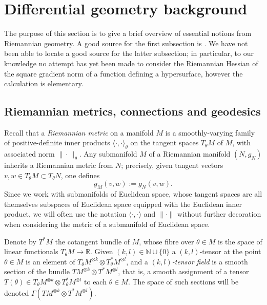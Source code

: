 \documentclass{article}
\newcommand{\RB}{\mathbb{R}}
\newcommand{\NB}{\mathbb{N}}
\theoremstyle{plain}
\theoremstyle{definition}
\theoremstyle{remark}
\begin{document}












\newpage

\appendix

\section{Differential geometry background}\label{app:diffgeom}

The purpose of this section is to give a brief overview of essential notions from Riemannian geometry. A good source for the first subsection is \cite{leeriem}. We have not been able to locate a good source for the latter subsection; in particular, to our knowledge no attempt has yet been made to consider the Riemannian Hessian of the square gradient norm of a function defining a hypersurface, however the calculation is elementary.

\subsection{Riemannian metrics, connections and geodesics}

Recall that a \emph{Riemannian metric} on a manifold $M$ is a smoothly-varying family of positive-definite inner products $\langle\cdot,\cdot\rangle_{\theta}$ on the tangent spaces $T_{\theta}M$ of $M$, with associated norm $\|\cdot\|_{\theta}$. Any submanifold $M$ of a Riemannian manifold $(N,g_N)$ inherits a Riemannian metric from $N$; precisely, given tangent vectors $v,w\in T_{\theta}M\subset T_{\theta} N$, one defines 
\begin{equation}
    g_M(v,w):=g_N(v,w).\label{eq:inducedmetric}
\end{equation}
Since we work with submanifolds of Euclidean space, whose tangent spaces are all themselves subspaces of Euclidean space equipped with the Euclidean inner product, we will often use the notation $\langle\cdot,\cdot\rangle$ and $\|\cdot\|$ without further decoration when considering the metric of a submanifold of Euclidean space.

Denote by $T^*M$ the cotangent bundle of $M$, whose fibre over $\theta\in M$ is the space of linear functionals $T_{\theta}M\rightarrow\RB$. Given $(k,l)\in\NB\cup\{0\}$ a $(k,l)$-tensor at the point $\theta\in M$ is an element of $T_{\theta}M^{\otimes k}\otimes T^*_{\theta}M^{\otimes l}$, and a \emph{$(k,l)$-tensor field} is a smooth section of the bundle $TM^{\otimes k}\otimes T^*M^{\otimes l}$, that is, a smooth assignment of a tensor $T(\theta)\in T_{\theta}M^{\otimes k}\otimes T^*_{\theta}M^{\otimes l}$ to each $\theta\in M$. The space of such sections will be denoted $\Gamma(TM^{\otimes k}\otimes T^*M^{\otimes l})$.
\end{document}
